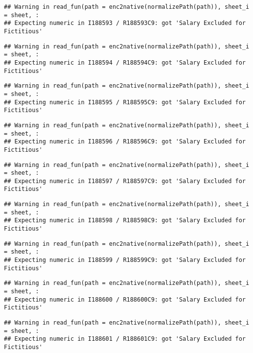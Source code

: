 \documentclass[
]{article}
\begin{document}
\begin{verbatim}
## Warning in read_fun(path = enc2native(normalizePath(path)), sheet_i = sheet, :
## Expecting numeric in I188593 / R188593C9: got 'Salary Excluded for Fictitious'
\end{verbatim}

\begin{verbatim}
## Warning in read_fun(path = enc2native(normalizePath(path)), sheet_i = sheet, :
## Expecting numeric in I188594 / R188594C9: got 'Salary Excluded for Fictitious'
\end{verbatim}

\begin{verbatim}
## Warning in read_fun(path = enc2native(normalizePath(path)), sheet_i = sheet, :
## Expecting numeric in I188595 / R188595C9: got 'Salary Excluded for Fictitious'
\end{verbatim}

\begin{verbatim}
## Warning in read_fun(path = enc2native(normalizePath(path)), sheet_i = sheet, :
## Expecting numeric in I188596 / R188596C9: got 'Salary Excluded for Fictitious'
\end{verbatim}

\begin{verbatim}
## Warning in read_fun(path = enc2native(normalizePath(path)), sheet_i = sheet, :
## Expecting numeric in I188597 / R188597C9: got 'Salary Excluded for Fictitious'
\end{verbatim}

\begin{verbatim}
## Warning in read_fun(path = enc2native(normalizePath(path)), sheet_i = sheet, :
## Expecting numeric in I188598 / R188598C9: got 'Salary Excluded for Fictitious'
\end{verbatim}

\begin{verbatim}
## Warning in read_fun(path = enc2native(normalizePath(path)), sheet_i = sheet, :
## Expecting numeric in I188599 / R188599C9: got 'Salary Excluded for Fictitious'
\end{verbatim}

\begin{verbatim}
## Warning in read_fun(path = enc2native(normalizePath(path)), sheet_i = sheet, :
## Expecting numeric in I188600 / R188600C9: got 'Salary Excluded for Fictitious'
\end{verbatim}

\begin{verbatim}
## Warning in read_fun(path = enc2native(normalizePath(path)), sheet_i = sheet, :
## Expecting numeric in I188601 / R188601C9: got 'Salary Excluded for Fictitious'
\end{verbatim}
\end{document}
